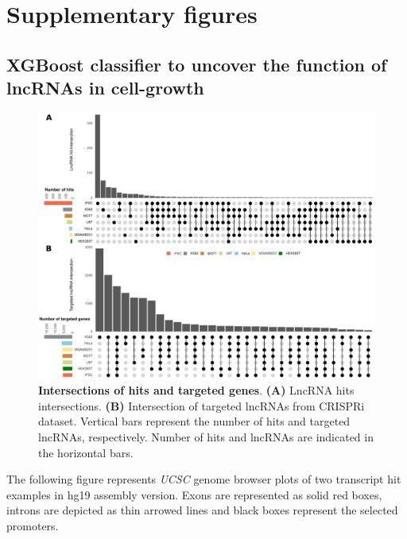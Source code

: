 \beginsupplement

\section[Supplementary figures]{Supplementary figures}
\label{sec:supp_fig}

\subsection{XGBoost classifier to uncover the function of lncRNAs in cell-growth}
\label{sec:sup_fig_part_2}

\begin{figure}[!htb]
  \centering
  \includegraphics[scale=0.44]{plots/appendix/ml/hits.lncRNAs.intersections.pdf}
  \caption[Intersections of hits and targeted genes]{\textbf{Intersections of hits and targeted genes}. \textbf{(A)} LncRNA hits intersections. \textbf{(B)} Intersection of targeted lncRNAs from CRISPRi dataset.  Vertical bars represent the number of hits and targeted lncRNAs, respectively. Number of hits and lncRNAs are indicated in the horizontal bars.}
  \label{supp-fig:hit-lncRNA-intersection}
\end{figure}

The following figure represents  \textit{UCSC} genome browser plots of two transcript hit examples in hg19 assembly version. Exons are represented as solid red boxes, introns are depicted as thin arrowed lines and black boxes represent the selected promoters.

